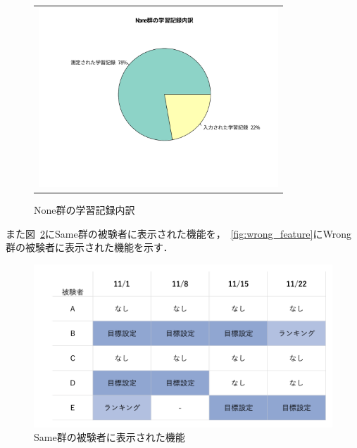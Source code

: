 \begin{figure}[htb]
\begin{center}
\begin{tabular}{c}
  \begin{minipage}[htb]{\linewidth}
  \begin{center}
  \includegraphics[width=9cm]{images/7/none_records_ratio.pdf}
  \caption{None群の学習記録内訳}
  \label{fig:none_records_ratio}
  \end{center}
  \end{minipage}

\end{tabular}
\end{center}
\end{figure}

また図~\ref{fig:same_feature}にSame群の被験者に表示された機能を，~\ref{fig:wrong_feature}にWrong群の被験者に表示された機能を示す．

\begin{figure}[h]
  \begin{center}
  \includegraphics[width=12cm]{images/7/same_feature.png}
  \caption{Same群の被験者に表示された機能}
  \label{fig:same_feature}
  \end{center}
\end{figure}


